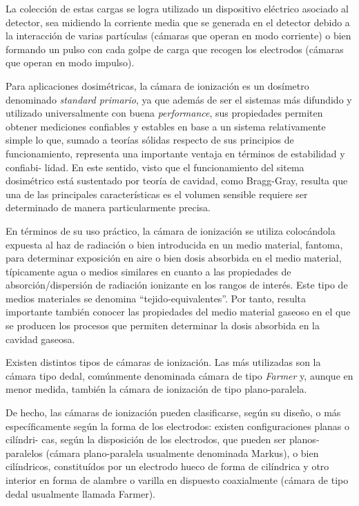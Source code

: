 La colecci\'on de estas cargas se logra utilizado un dispositivo el\'ectrico asociado al detector, sea midiendo la corriente media que se generada en el 
detector debido a la interacci\'on de varias part\'iculas (c\'amaras que operan en modo corriente) o bien formando un pulso con cada golpe de carga que 
recogen los electrodos (c\'amaras que operan en modo impulso).

Para aplicaciones dosim\'etricas, la c\'amara de ionizaci\'on es un dos\'imetro denominado \textit{standard primario}, ya que adem\'as de ser el sistemas m\'as difundido y utilizado 
universalmente con buena \textit{performance}, sus propiedades permiten obtener mediciones confiables y estables en base a un sistema relativamente simple 
lo que, sumado a teor\'ias s\'olidas respecto de sus principios de funcionamiento, representa una importante ventaja en t\'erminos de estabilidad y 
confiabi-\-
lidad. En este sentido, visto que el funcionamiento del sitema dosim\'etrico est\'a sustentado por teor\'ia de cavidad, como Bragg-Gray, resulta que 
una de las principales caracter\'isticas es el volumen sensible requiere ser determinado de manera particularmente precisa.

En t\'erminos de su uso pr\'actico, la c\'amara de ionizaci\'on se utiliza coloc\'andola expuesta al haz de radiaci\'on o bien introducida en un medio 
material, fantoma, para determinar exposici\'on en aire o bien dosis absorbida en el medio material, t\'ipicamente agua o medios similares en cuanto a las 
propiedades de absorci\'on/dispersi\'on de radiaci\'on ionizante en los rangos de inter\'es. 
Este tipo de medios materiales se denomina ``tejido-equivalentes''. Por tanto, resulta importante tambi\'en conocer las propiedades
del medio material gaseoso en el que se producen los procesos que permiten determinar la dosis absorbida en la cavidad gaseosa.

Existen distintos tipos de c\'amaras de ionizaci\'on. Las m\'as utilizadas son la c\'amara tipo dedal, com\'unmente denominada c\'amara de tipo \textit{Farmer}
y, aunque en menor medida, tambi\'en la c\'amara de ionizaci\'on de tipo plano-paralela.

De hecho, las c\'amaras de ionizaci\'on pueden clasificarse, seg\'un su dise\~no, o m\'as espec\'ificamente seg\'un la forma de los electrodos: 
existen configuraciones planas o
cil\'indri-\-
cas, seg\'un la disposici\'on de los electrodos, que pueden ser  planos-paralelos (c\'amara plano-paralela usualmente denominada Markus), o bien
cil\'indricos, constitu\'idos por un electrodo hueco de forma de cil\'indrica y otro interior en forma de alambre o varilla en dispuesto coaxialmente 
(c\'amara de tipo dedal usualmente llamada Farmer).

